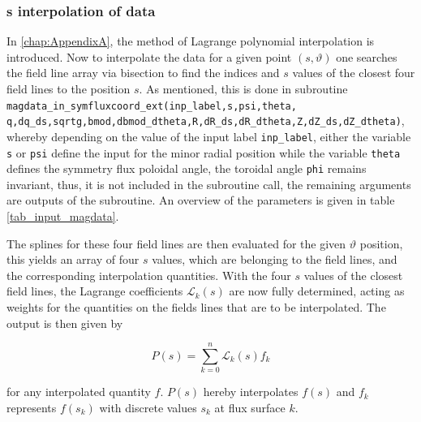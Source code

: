 \documentclass[./main.tex]{subfiles}
\begin{document}
\subsubsection{s interpolation of data}
In \autoref{chap:AppendixA}, the method of Lagrange polynomial interpolation is introduced. Now to interpolate the data for a given point $(s,\vartheta)$ one searches the field line array via bisection to find the indices and $s$ values of the closest four field lines to the position $s$. As mentioned, this is done in subroutine \texttt{magdata\_in\_symfluxcoord\_ext(inp\_label,s,psi,theta,}\\
\texttt{q,dq\_ds,sqrtg,bmod,dbmod\_dtheta,R,dR\_ds,dR\_dtheta,Z,dZ\_ds,dZ\_dtheta)},\\
whereby depending on the value of the input label \texttt{inp\_label}, either the variable \texttt{s} or \texttt{psi} define the input for the minor radial position while the variable \texttt{theta} defines the symmetry flux poloidal angle, the toroidal angle \texttt{phi} remains invariant, thus, it is not included in the subroutine call, the remaining arguments are outputs of the subroutine. An overview of the parameters is given in table \ref{tab_input_magdata}. 

The splines for these four field lines are then evaluated for the given $\vartheta$ position, this yields an array of four $s$ values, which are belonging to the field lines, and the corresponding interpolation quantities. With the four $s$ values of the closest field lines, the Lagrange coefficients $\mathscr{L}_k(s)$ are now fully determined, acting as weights for the quantities on the fields lines that are to be interpolated.
The output is then given by

\begin{equation*}
		P(s) = \sum_{k=0}^{n} \mathscr{L}_k(s)f_k
\end{equation*}

for any interpolated quantity $f$. $P(s)$ hereby interpolates $f(s)$ and $f_k$ represents $f(s_k)$ with discrete values $s_k$ at flux surface $k$.
\end{document}
